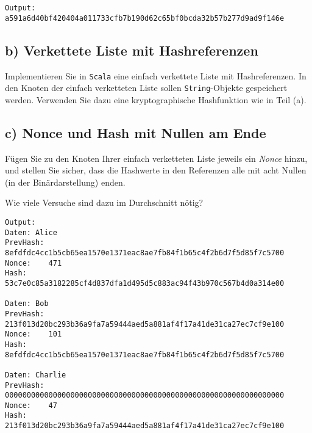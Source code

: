 
\begin{verbatim}
Output: a591a6d40bf420404a011733cfb7b190d62c65bf0bcda32b57b277d9ad9f146e
\end{verbatim}

\vspace{1em}

\newpage
\subsection*{b) Verkettete Liste mit Hashreferenzen}

Implementieren Sie in \texttt{Scala} eine einfach verkettete Liste mit Hashreferenzen.  
In den Knoten der einfach verketteten Liste sollen \texttt{String}-Objekte gespeichert werden.  
Verwenden Sie dazu eine kryptographische Hashfunktion wie in Teil (a).




\vspace{1em}

\newpage
\subsection*{c) Nonce und Hash mit Nullen am Ende}

Fügen Sie zu den Knoten Ihrer einfach verketteten Liste jeweils ein \emph{Nonce} hinzu,  
und stellen Sie sicher, dass die Hashwerte in den Referenzen alle mit acht Nullen (in der Binärdarstellung) enden.  

Wie viele Versuche sind dazu im Durchschnitt nötig?\\



\begin{verbatim}
Output:
Daten: Alice
PrevHash: 8efdfdc4cc1b5cb65ea1570e1371eac8ae7fb84f1b65c4f2b6d7f5d85f7c5700
Nonce:    471
Hash:     53c7e0c85a3182285cf4d837dfa1d495d5c883ac94f43b970c567b4d0a314e00

Daten: Bob
PrevHash: 213f013d20bc293b36a9fa7a59444aed5a881af4f17a41de31ca27ec7cf9e100
Nonce:    101
Hash:     8efdfdc4cc1b5cb65ea1570e1371eac8ae7fb84f1b65c4f2b6d7f5d85f7c5700

Daten: Charlie
PrevHash: 0000000000000000000000000000000000000000000000000000000000000000
Nonce:    47
Hash:     213f013d20bc293b36a9fa7a59444aed5a881af4f17a41de31ca27ec7cf9e100
\end{verbatim}

